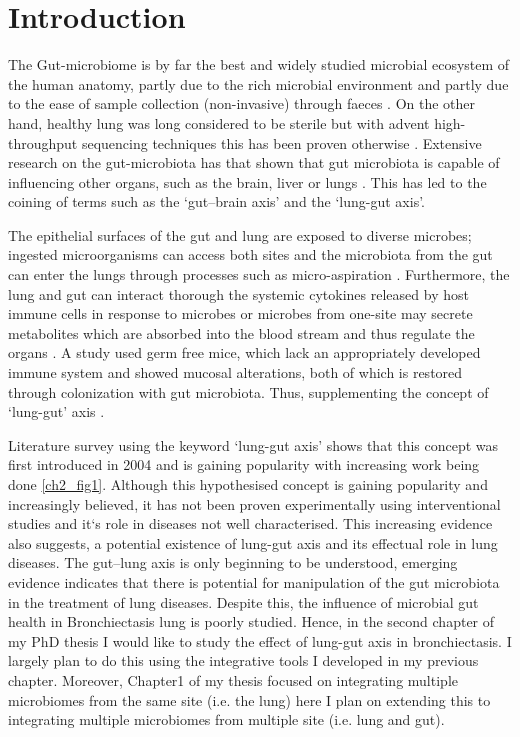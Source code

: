 \section{Introduction}

The Gut-microbiome is by far the best and widely studied microbial ecosystem of the human anatomy, partly due to the rich microbial environment and partly due to the ease of sample collection (non-invasive) through faeces \cite{Budden2017}. On the other hand, healthy lung was long considered to be sterile but with advent high-throughput sequencing techniques this has been proven otherwise \cite{Barker2002}. Extensive research on the gut-microbiota has that shown that gut microbiota is capable of influencing other organs, such as the brain, liver or lungs \cite{Bell2019}. This has led to the coining of terms such as the `gut–brain axis' and the `lung-gut axis'. 

The epithelial surfaces of the gut and lung are exposed to diverse microbes; ingested microorganisms can access both sites and the microbiota from the gut can enter the lungs through processes such as micro-aspiration \cite{Budden2017}. Furthermore, the lung and gut can interact thorough the systemic cytokines released by host immune cells in response to microbes or  microbes from one-site may secrete metabolites which are absorbed into the blood stream and thus regulate the organs \cite{Dang2019}. A study used germ free mice, which lack an appropriately developed immune system and showed mucosal alterations, both of which is restored through colonization with gut microbiota. Thus, supplementing the concept of `lung-gut' axis \cite{Budden2017}. 

Literature survey using the keyword `lung-gut axis' shows that this concept was first introduced in 2004 and is gaining popularity with increasing work being done \ref{ch2_fig1}. Although this hypothesised concept is gaining popularity and increasingly believed, it has not been proven experimentally using interventional studies and it`s role in diseases not well characterised. This increasing evidence also suggests, a potential existence of lung-gut axis and its effectual role in lung diseases. The gut–lung axis is only beginning to be understood, emerging evidence indicates that there is potential for manipulation of the gut microbiota in the treatment of lung diseases. Despite this, the influence of microbial gut health in Bronchiectasis lung is poorly studied. Hence, in the second chapter of my PhD thesis I would like to study the effect of lung-gut axis in bronchiectasis. I largely plan to do this using the integrative tools I developed in my previous chapter. Moreover, Chapter1 of my thesis focused on integrating multiple microbiomes from the same site (i.e. the lung) here I plan on extending this to integrating multiple microbiomes from multiple site (i.e. lung and gut). 

